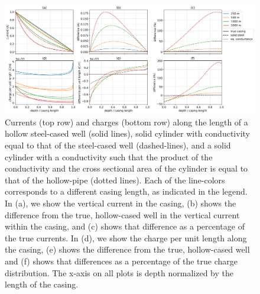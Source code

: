 \begin{figure}
    \begin{center}
    \includegraphics[width=\textwidth]{figures/dc_casing/approximating_wells_currents_charges.png}
    \end{center}
\caption{
    Currents (top row) and charges (bottom row) along the length of
    a hollow steel-cased well (solid lines), solid cylinder with
    conductivity equal to that of the steel-cased well (dashed-lines),
    and a solid cylinder with a conductivity such that the product of the
    conductivity and the cross sectional area of the cylinder is equal to that
    of the hollow-pipe (dotted lines). Each of the line-colors corresponds to a
    different casing length, as indicated in the legend.
    In (a), we show the vertical current in the casing,
    (b) shows the difference from the true, hollow-cased well
    in the vertical current within the casing, and (c) shows that difference as a percentage
    of the true currents. In (d), we show the charge per unit length along the casing, (e)
    shows the difference from the true, hollow-cased well and (f) shows that differences as
    a percentage of the true charge distribution.
    The x-axis on all plots is depth normalized by the length of the casing.
}
\label{fig:approximating_wells_currents_charges}
\end{figure}
